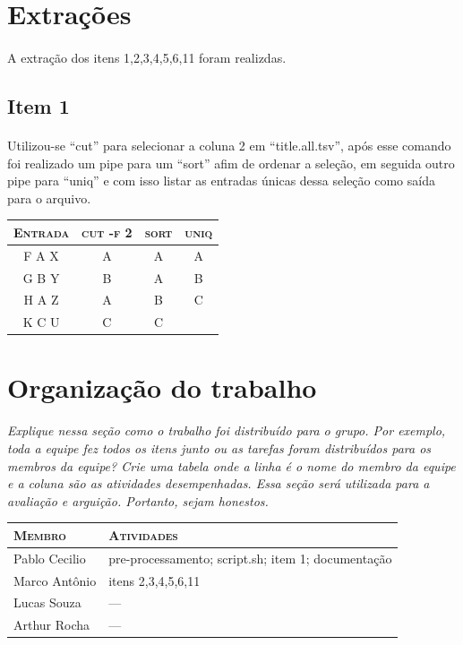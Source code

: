 \documentclass[12pt]{article}
\begin{document}
\section{Extrações}

\paragraph{}
A extração dos itens 1,2,3,4,5,6,11 foram realizdas.

\subsection*{Item 1}

\paragraph{}
Utilizou-se ``cut'' para selecionar a coluna 2 em ``title.all.tsv'', após esse comando foi realizado um pipe para um ``sort'' afim de ordenar a seleção, em seguida outro pipe para ``uniq'' e com isso listar as entradas únicas dessa seleção como saída para o arquivo.

\begin{table}[!htb]
    \begin{tabular}{ c c c c }
        \textsc{Entrada} & \textsc{cut -f 2} & \textsc{sort} & \textsc{uniq} \\ 
        \hline
        F A X & A & A & A \\ 
        G B Y & B & A & B \\
        H A Z & A & B & C \\
        K C U & C & C &   \\
    \end{tabular}
\end{table}

\section{Organização do trabalho}

\emph{Explique nessa seção como o trabalho foi distribuído para o grupo.
Por exemplo, toda a equipe fez todos os itens junto ou as tarefas foram 
distribuídos para os membros da equipe? Crie uma tabela onde a linha é o
nome do membro da equipe e a coluna são as atividades desempenhadas.
Essa seção será utilizada para a avaliação e arguição. Portanto, sejam
honestos.}

\begin{table}[!htb]
    \begin{tabular}{p{5cm}p{7.5cm}}
    
        \textsc{Membro}      & \textsc{Atividades} \\ 
	    \hline
        Pablo Cecilio & pre-processamento; script.sh; item 1; documentação \\ 
        Marco Antônio & itens 2,3,4,5,6,11\\
        Lucas Souza & --- \\
        Arthur Rocha & --- \\

    \end{tabular}
\end{table}
\end{document}
